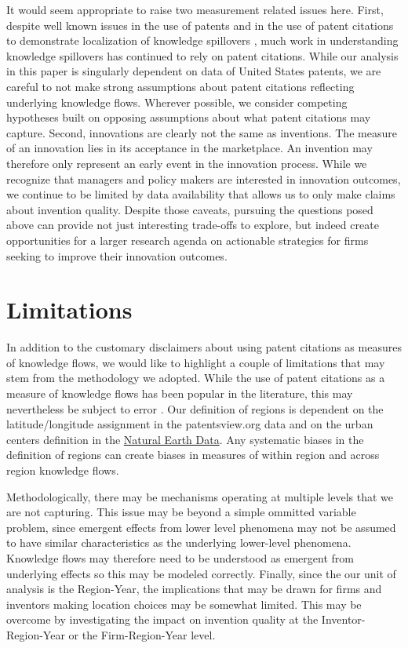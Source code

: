 \documentclass[12pt,letterpaper]{article}
\begin{document}
It would seem appropriate to raise two measurement related issues here. First, despite well known issues in the use of patents \citep{Griliches1990, Scherer1984} and in the use of patent citations to demonstrate localization of knowledge spillovers \citep*{Thompson2005, Arora2017a}, much work in understanding knowledge spillovers has continued to rely on patent citations. While our analysis in this paper is singularly dependent on data of United States patents, we are careful to not make strong assumptions about patent citations reflecting underlying knowledge flows. Wherever possible, we consider competing hypotheses built on opposing assumptions about what patent citations may capture. Second, innovations are clearly not the same as inventions. The measure of an innovation lies in its acceptance in the marketplace. An invention may therefore only represent an early event in the innovation process. While we recognize that managers and policy makers are interested in innovation outcomes, we continue to be limited by data availability that allows us to only make claims about invention quality. Despite those caveats, pursuing the questions posed above can provide not just interesting trade-offs to explore, but indeed create opportunities for a larger research agenda on actionable strategies for firms seeking to improve their innovation outcomes.\par


\section*{Limitations}
In addition to the customary disclaimers about using patent citations as measures of knowledge flows, we would like to highlight a couple of limitations that may stem from the methodology we adopted. While the use of patent citations as a measure of knowledge flows has been popular in the literature, this may nevertheless be subject to error \citep*{Arora2017a}. Our definition of regions is dependent on the latitude/longitude assignment in the patentsview.org data and on the urban centers definition in the \href{http://www.naturalearthdata.com/downloads/10m-cultural-vectors/}{Natural Earth Data}. Any systematic biases in the definition of regions can create biases in measures of within region and across region knowledge flows. \par

Methodologically, there may be mechanisms operating at multiple levels that we are not capturing. This issue may be beyond a simple ommitted variable problem, since emergent effects from lower level phenomena may not be assumed to have similar characteristics as the underlying lower-level phenomena. Knowledge flows may therefore need to be understood as emergent from underlying effects so this may be modeled correctly. Finally, since the our unit of analysis is the Region-Year, the implications that may be drawn for firms and inventors making location choices may be somewhat limited. This may be overcome by investigating the impact on invention quality at the Inventor-Region-Year or the Firm-Region-Year level. 
\end{document}
